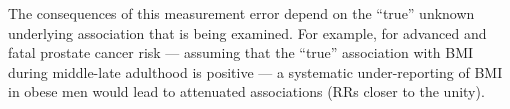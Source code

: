 The consequences of this measurement error depend on the ``true'' unknown underlying association that is being examined. For example, for advanced and fatal prostate cancer risk --- assuming that the ``true'' association with BMI during middle-late adulthood is positive ---  a systematic under-reporting of BMI in obese men would lead to attenuated associations (RRs closer to the unity). 














